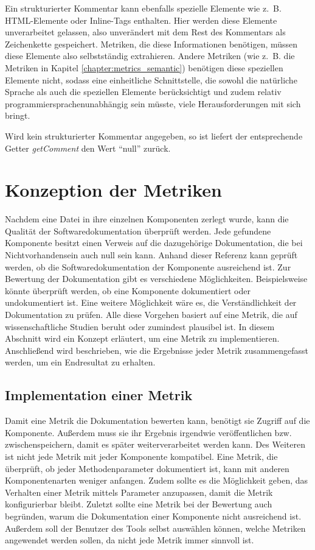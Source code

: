  Ein strukturierter Kommentar kann ebenfalls spezielle Elemente wie z.~B. \ac{HTML}-Elemente oder Inline-Tags enthalten. Hier werden diese Elemente unverarbeitet gelassen, also unverändert mit dem Rest des Kommentars als Zeichenkette gespeichert. Metriken, die diese Informationen benötigen, müssen diese Elemente also selbstständig extrahieren. Andere Metriken (wie z.~B. die Metriken in Kapitel \ref{chapter:metrics_semantic}) benötigen diese speziellen Elemente nicht, sodass eine einheitliche Schnittstelle, die sowohl die natürliche Sprache als auch die speziellen Elemente berücksichtigt und  zudem relativ programmiersprachenunabhängig sein müsste, viele Herausforderungen mit sich bringt.   
 
 Wird kein strukturierter Kommentar angegeben, so ist liefert der entsprechende Getter \textit{getComment} den Wert \enquote{null} zurück. 
\section{Konzeption der Metriken}
Nachdem eine Datei in ihre einzelnen Komponenten zerlegt wurde, kann die Qualität der Softwaredokumentation überprüft werden. Jede gefundene Komponente besitzt einen Verweis auf die dazugehörige Dokumentation, die bei Nichtvorhandensein auch null sein kann. Anhand dieser Referenz kann geprüft werden, ob die Softwaredokumentation der Komponente ausreichend ist. Zur Bewertung der Dokumentation gibt es verschiedene  Möglichkeiten. Beispielsweise könnte überprüft werden, ob eine Komponente dokumentiert oder undokumentiert ist. Eine weitere Möglichkeit wäre es, die Verständlichkeit der Dokumentation zu prüfen. Alle diese Vorgehen basiert auf eine Metrik, die auf wissenschaftliche Studien beruht oder zumindest plausibel ist. In diesem Abschnitt wird ein Konzept erläutert, um eine Metrik zu implementieren. Anschließend wird beschrieben, wie die Ergebnisse jeder Metrik zusammengefasst werden, um ein Endresultat zu erhalten. 

\subsection{Implementation einer Metrik}\label{chapter:metric_impl}
Damit eine Metrik die Dokumentation bewerten kann, benötigt sie Zugriff auf die Komponente. Außerdem muss sie ihr Ergebnis irgendwie veröffentlichen bzw. zwischenspeichern, damit es später weiterverarbeitet werden kann. Des Weiteren ist nicht jede Metrik mit jeder Komponente kompatibel. Eine Metrik, die überprüft, ob jeder Methodenparameter dokumentiert ist, kann mit anderen Komponentenarten weniger anfangen. Zudem sollte es die Möglichkeit geben, das Verhalten einer Metrik mittels Parameter anzupassen, damit die Metrik konfigurierbar bleibt. Zuletzt sollte eine Metrik bei der Bewertung auch begründen, warum die Dokumentation einer Komponente nicht ausreichend ist. Außerdem soll der Benutzer des Tools selbst auswählen können, welche Metriken angewendet werden sollen, da nicht jede Metrik immer sinnvoll ist. 

